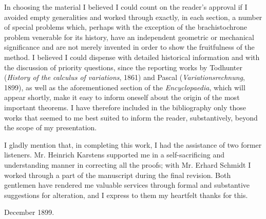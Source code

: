 \documentclass[11pt,a4paper,leqno]{article}
\begin{document}
In choosing the material I believed I could count on the reader's approval if I avoided empty generalities and worked through exactly, in each section, a number of special problems which, perhaps with the exception of the brachistochrone problem venerable for its history, have an independent geometric or mechanical significance and are not merely invented in order to show the fruitfulness of the method. I believed I could dispense with detailed historical information and with the discussion of priority questions, since the reporting works by Todhunter (\emph{History of the calculus of variations}, 1861) and Pascal (\emph{Variationsrechnung}, 1899), as well as the aforementioned section of the \emph{Encyclopaedia}, which will appear shortly, make it easy to inform oneself about the origin of the most important theorems. I have therefore included in the bibliography only those works that seemed to me best suited to inform the reader, substantively, beyond the scope of my presentation.

I gladly mention that, in completing this work, I had the assistance of two former listeners. Mr. Heinrich Karstens supported me in a self-sacrificing and understanding manner in correcting all the proofs; with Mr. Erhard Schmidt I worked through a part of the manuscript during the final revision. Both gentlemen have rendered me valuable services through formal and substantive suggestions for alteration, and I express to them my heartfelt thanks for this.

\medskip
December 1899.
\end{document}
